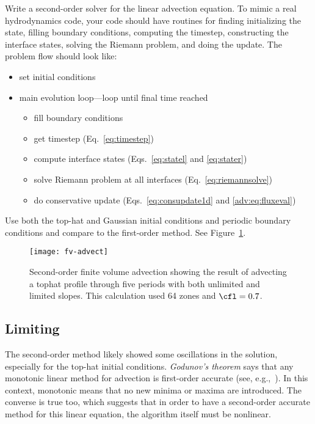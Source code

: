 \begin{exercise}
{\label{adv:ex:fv} Write a second-order solver for the linear advection
  equation.  To mimic a real hydrodynamics code, your code should have
  routines for finding initializing the state, filling boundary conditions,
  computing the timestep,
  constructing the interface states, solving the Riemann problem, and
  doing the update.  The problem flow should look like:
  \begin{itemize}
    \item set initial conditions
    \item main evolution loop---loop until final time reached
    \begin{itemize}
      \item fill boundary conditions
      \item get timestep (Eq.~\ref{eq:timestep})
      \item compute interface states (Eqs.~\ref{eq:statel} and \ref{eq:stater})
      \item solve Riemann problem at all interfaces (Eq.~\ref{eq:riemannsolve})
      \item do conservative update (Eqs.~\ref{eq:consupdate1d} and \ref{adv:eq:fluxeval})
    \end{itemize}
  \end{itemize}
Use both the top-hat and Gaussian initial conditions and periodic boundary
conditions and compare to the first-order method.  See Figure~\ref{fig:fvadvect}.
}
\end{exercise}

\begin{figure}
\centering
\texttt{[image: fv-advect]}
\caption[Second-order finite-volume advection]
{\label{fig:fvadvect} Second-order finite volume advection showing the
result of advecting a tophat profile through five periods with both
unlimited and limited slopes.  This calculation used 64 zones and
$\cfl=0.7$. \\
}
\end{figure}

\subsection{Limiting}

The second-order method likely showed some oscillations in the
solution, especially for the top-hat initial conditions.  {\em
  Godunov's theorem} says that any monotonic linear method for
advection is first-order accurate (see, e.g.,~\cite{laney}).  In this
context, monotonic means that no new minima or maxima are introduced.
The converse is true too, which suggests that in order to have a
second-order accurate method for this linear equation, the algorithm
itself must be nonlinear.

